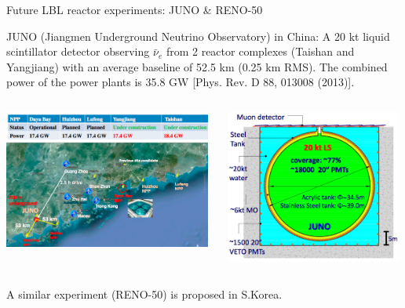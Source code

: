 \begin{frame}{Future LBL reactor experiments: JUNO \& RENO-50}

{\small
JUNO (Jiangmen Underground Neutrino Observatory) in China: A 20 kt liquid scintillator detector
observing $\bar{\nu}_{e}$ from 2 reactor complexes (Taishan and Yangjiang) with an average baseline
of 52.5 km (0.25 km RMS). The combined power of the power plants is 35.8 GW
{\scriptsize \color{blue}[Phys. Rev. D 88, 013008 (2013)]}.
}
\begin{columns}[T]
  \begin{column}{0.55\textwidth}
    \centering
     \includegraphics[width=0.98\textwidth]{./images/3nu/reactor/juno_location.png}\\
  \end{column}
  \begin{column}{0.45\textwidth}
     \includegraphics[width=0.98\textwidth]{./images/3nu/reactor/juno_schematic.png}\\
  \end{column}
\end{columns}
A similar experiment (RENO-50) is proposed in S.Korea.
\end{frame}



